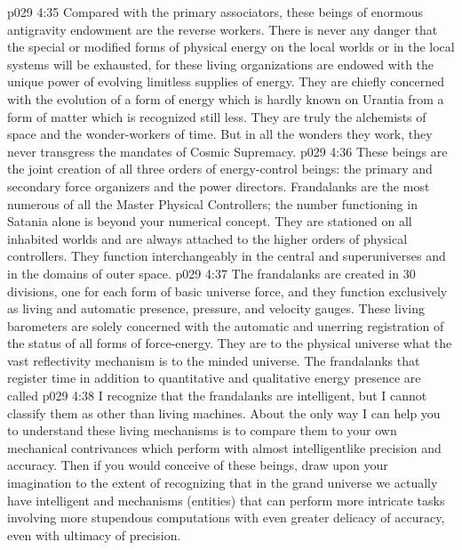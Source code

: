 \vs p029 4:35 \bibnobreakspace {} Compared with the primary associators, these beings of enormous antigravity endowment are the reverse workers. There is never any danger that the special or modified forms of physical energy on the local worlds or in the local systems will be exhausted, for these living organizations are endowed with the unique power of evolving limitless supplies of energy. They are chiefly concerned with the evolution of a form of energy which is hardly known on Urantia from a form of matter which is recognized still less. They are truly the alchemists of space and the wonder\hyp{}workers of time. But in all the wonders they work, they never transgress the mandates of Cosmic Supremacy.
\vs p029 4:36 \bibnobreakspace {} These beings are the joint creation of all three orders of energy\hyp{}control beings: the primary and secondary force organizers and the power directors. Frandalanks are the most numerous of all the Master Physical Controllers; the number functioning in Satania alone is beyond your numerical concept. They are stationed on all inhabited worlds and are always attached to the higher orders of physical controllers. They function interchangeably in the central and superuniverses and in the domains of outer space.
\vs p029 4:37 The frandalanks are created in 30 divisions, one for each form of basic universe force, and they function exclusively as living and automatic presence, pressure, and velocity gauges. These living barometers are solely concerned with the automatic and unerring registration of the status of all forms of force\hyp{}energy. They are to the physical universe what the vast reflectivity mechanism is to the minded universe. The frandalanks that register time in addition to quantitative and qualitative energy presence are called 
\vs p029 4:38 I recognize that the frandalanks are intelligent, but I cannot classify them as other than living machines. About the only way I can help you to understand these living mechanisms is to compare them to your own mechanical contrivances which perform with almost intelligentlike precision and accuracy. Then if you would conceive of these beings, draw upon your imagination to the extent of recognizing that in the grand universe we actually have intelligent and  mechanisms (entities) that can perform more intricate tasks involving more stupendous computations with even greater delicacy of accuracy, even with ultimacy of precision.
